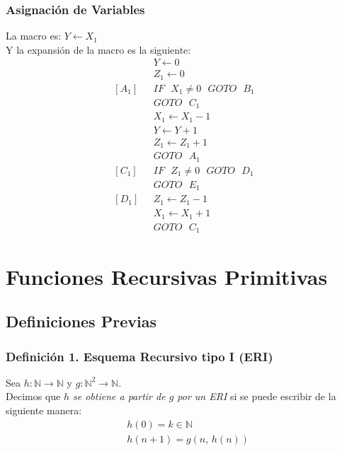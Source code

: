 \documentclass{article}
\newcommand{\comma}{,\,}                                %
\newcommand{\naturales}{\mathbb{N}}                     %
\newcommand{\msaltoinc}[2]{IF \text{ } #1 \neq 0 \text{ } GOTO \text{ } #2}
\newcommand{\ms}{\text{ }}
\begin{document}
\subsubsection{Asignación de Variables}
La macro es: $Y \leftarrow X_1$
\\Y la expansión de la macro es la siguiente:
    \begin{align*}
        &Y \leftarrow 0 \\
        &Z_1 \leftarrow 0 \\
        [A_1] \ms &\msaltoinc{X_1}{B_1}\\
        &GOTO \ms C_1\\
        &X_1 \leftarrow X_1 - 1\\
        &Y \leftarrow Y+1\\
        &Z_1 \leftarrow Z_1 + 1\\
        &GOTO \ms A_1\\
        [C_1] \ms &\msaltoinc{Z_1}{D_1}\\
        &GOTO \ms E_1\\
        [D_1] \ms &Z_1 \leftarrow Z_1 - 1 \\
        &X_1 \leftarrow X_1 + 1\\
        &GOTO \ms C_1
    \end{align*}
    

\newpage
\section{Funciones Recursivas Primitivas}
\subsection{Definiciones Previas}
\subsubsection*{Definición 1. Esquema Recursivo tipo I (ERI)}
Sea $h: \naturales \rightarrow \naturales$ y $g: \naturales^2 \rightarrow \naturales$. 
\\Decimos que \emph{$h$ se obtiene a partir de $g$ por un ERI} si se puede escribir de la siguiente manera:
\begin{align*}
    &h(0) = k \in \naturales \\
    &h(n+1) = g(n \comma h(n))
\end{align*}
\end{document}
